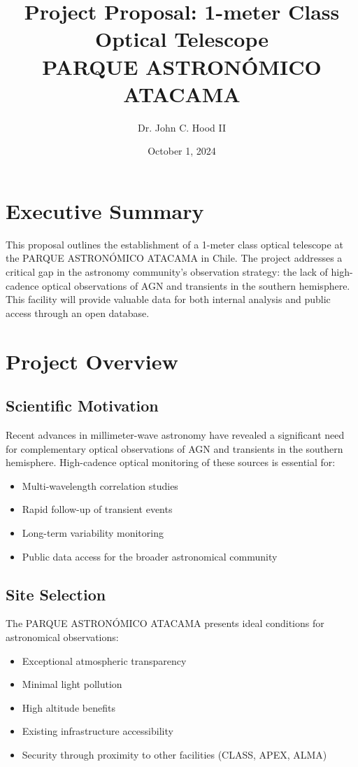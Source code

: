 \documentclass{article}
\title{Project Proposal: 1-meter Class Optical Telescope\\
PARQUE ASTRONÓMICO ATACAMA}
\author{Dr. John C. Hood II}
\date{October 1, 2024}
\begin{document}
\maketitle

\tableofcontents

\section{Executive Summary}
This proposal outlines the establishment of a 1-meter class optical telescope at the PARQUE ASTRONÓMICO ATACAMA in Chile. The project addresses a critical gap in the astronomy community's observation strategy: the lack of high-cadence optical observations of AGN and transients in the southern hemisphere. This facility will provide valuable data for both internal analysis and public access through an open database.

\section{Project Overview}

\subsection{Scientific Motivation}
Recent advances in millimeter-wave astronomy have revealed a significant need for complementary optical observations of AGN and transients in the southern hemisphere. High-cadence optical monitoring of these sources is essential for:
\begin{itemize}
    \item Multi-wavelength correlation studies
    \item Rapid follow-up of transient events
    \item Long-term variability monitoring
    \item Public data access for the broader astronomical community
\end{itemize}

\subsection{Site Selection}
The PARQUE ASTRONÓMICO ATACAMA presents ideal conditions for astronomical observations:
\begin{itemize}
    \item Exceptional atmospheric transparency
    \item Minimal light pollution
    \item High altitude benefits
    \item Existing infrastructure accessibility
    \item Security through proximity to other facilities (CLASS, APEX, ALMA)
\end{itemize}
\end{document}
